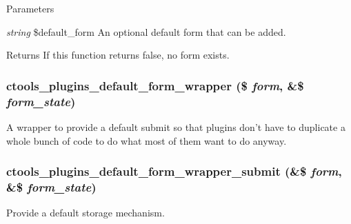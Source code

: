 \begin{DoxyParams}{Parameters}
\item[{\em string}]\$default\_\-form An optional default form that can be added.\end{DoxyParams}
\begin{DoxyReturn}{Returns}
If this function returns false, no form exists. 
\end{DoxyReturn}
\hypertarget{plugins-admin_8inc_a1d39e12bf4223de64c6b09afd842896a}{
\subsubsection[{ctools\_\-plugins\_\-default\_\-form\_\-wrapper}]{\setlength{\rightskip}{0pt plus 5cm}ctools\_\-plugins\_\-default\_\-form\_\-wrapper (\$ {\em form}, \/  \&\$ {\em form\_\-state})}}
\label{plugins-admin_8inc_a1d39e12bf4223de64c6b09afd842896a}
A wrapper to provide a default submit so that plugins don't have to duplicate a whole bunch of code to do what most of them want to do anyway. \hypertarget{plugins-admin_8inc_a85e36f694b3c1ac84b67ed129fb4ef59}{
\subsubsection[{ctools\_\-plugins\_\-default\_\-form\_\-wrapper\_\-submit}]{\setlength{\rightskip}{0pt plus 5cm}ctools\_\-plugins\_\-default\_\-form\_\-wrapper\_\-submit (\&\$ {\em form}, \/  \&\$ {\em form\_\-state})}}
\label{plugins-admin_8inc_a85e36f694b3c1ac84b67ed129fb4ef59}
Provide a default storage mechanism. 
